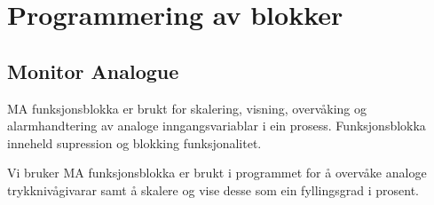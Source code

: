 \section{Programmering av blokker}
\thispagestyle{fancy}



\subsection{Monitor Analogue}
\gls{MA} funksjonsblokka er brukt for skalering, visning, overvåking og alarmhandtering av analoge inngangsvariablar i ein prosess.
Funksjonsblokka inneheld supression og blokking funksjonalitet.

Vi bruker \gls{MA} funksjonsblokka er brukt i programmet for å overvåke analoge trykknivågivarar samt å skalere og vise desse som ein fyllingsgrad i prosent.

